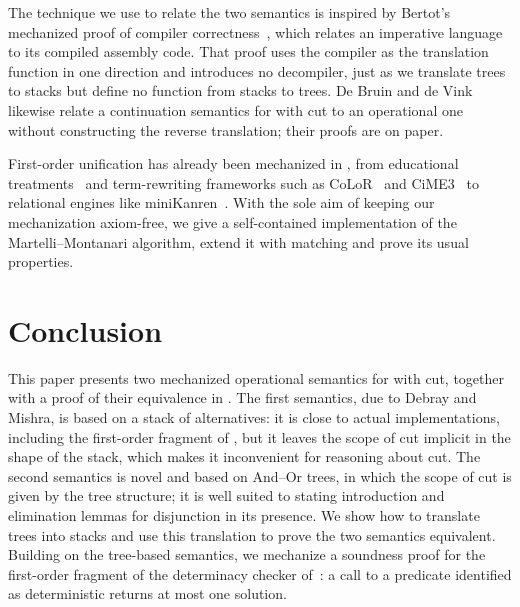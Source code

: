 \documentclass[sigplan,10pt,anonymous,review]{acmart}
\begin{document}
The technique we use to relate the two semantics is inspired by Bertot's
mechanized proof of compiler correctness~\cite{yves-equiv}, which relates an
imperative language to its compiled assembly code. That proof uses the compiler
as the translation function in one direction and introduces no decompiler, just
as we translate trees to stacks but define no function from stacks to trees.
De Bruin and de Vink~\cite{1989Vink,1990Vink}
likewise relate a continuation semantics for \prologP with cut to an operational one without
constructing the reverse translation; their proofs are on paper.

First-order unification has already been mechanized in \rocqP{}, from
educational treatments~\cite{smolka2014cl} and term-rewriting frameworks
such as CoLoR~\cite{color} and CiME3~\cite{coccinelle} to relational engines
like miniKanren~\cite{miniKanren}. With the sole aim of keeping our
mechanization axiom-free, we give a self-contained implementation of the
Martelli--Montanari algorithm, extend it with matching
and prove its usual properties.

\section{Conclusion}

This paper presents two mechanized operational semantics for \prologP
with cut, together with a proof of their equivalence in \rocqP. The first
semantics, due to Debray and Mishra, is based on a stack of
alternatives: it is close to actual \prologP implementations,
including the first-order fragment of \elpiP, but it leaves the scope
of cut implicit in the shape of the stack, which makes it inconvenient
for reasoning about cut. The second semantics is novel and based on
And--Or trees, in which the scope of cut is given by the tree
structure; it is well suited to stating introduction and elimination lemmas for
disjunction in its presence. We show how to translate trees into
stacks and use this translation to prove the two semantics equivalent.
Building on the tree-based semantics, we mechanize a soundness proof
for the first-order fragment of the determinacy checker
of~\cite{fissore2026}: a call to a predicate identified as
deterministic returns at most one solution.
\end{document}
